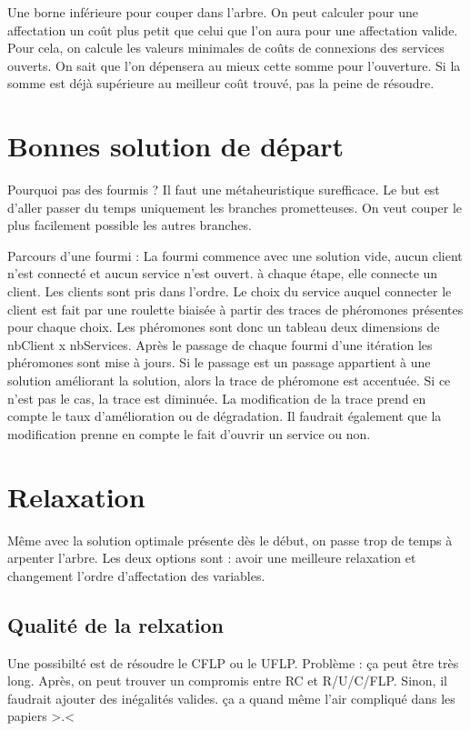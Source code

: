 Une borne inférieure pour couper dans l'arbre.
On peut calculer pour une affectation un coût plus petit que celui que l'on aura pour une affectation valide.
Pour cela, on calcule les valeurs minimales de coûts de connexions des services ouverts.
On sait que l'on dépensera au mieux cette somme pour l'ouverture. Si la somme est déjà supérieure au meilleur coût trouvé, pas la peine de résoudre.

\section{Bonnes solution de départ}

Pourquoi pas des fourmis ? Il faut une métaheuristique surefficace. Le but est d'aller passer du temps uniquement les branches prometteuses.
On veut couper le plus facilement possible les autres branches. \newline

Parcours d'une fourmi : La fourmi commence avec une solution vide, aucun client n'est connecté et aucun service n'est ouvert.
à chaque étape, elle connecte un client. Les clients sont pris dans l'ordre.
Le choix du service auquel connecter le client est fait par une roulette biaisée à partir des traces de phéromones présentes pour chaque choix.
Les phéromones sont donc un tableau deux dimensions de nbClient x nbServices.
Après le passage de chaque fourmi d'une itération les phéromones sont mise à jours.
Si le passage est un passage appartient à une solution améliorant la solution, alors la trace de phéromone est accentuée.
Si ce n'est pas le cas, la trace est diminuée. La modification de la trace prend en compte le taux d'amélioration ou de dégradation.
Il faudrait également que la modification prenne en compte le fait d'ouvrir un service ou non.

\section{Relaxation}

Même avec la solution optimale présente dès le début, on passe trop de temps à arpenter l'arbre.
Les deux options sont : avoir une meilleure relaxation et changement l'ordre d'affectation des variables.

\subsection{Qualité de la relxation}

Une possibilté est de résoudre le CFLP ou le UFLP. Problème : ça peut être très long. Après, on peut trouver un compromis entre RC et R/U/C/FLP.
Sinon, il faudrait ajouter des inégalités valides. ça a quand même l'air compliqué dans les papiers >.<

